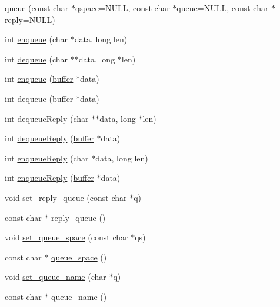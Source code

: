 \begin{DoxyCompactItemize}
\item 
\hyperlink{classatmi_1_1queue_af8c86b01e410fe6499a7f53cdf70eb35}{queue} (const char $\ast$qspace=N\+U\+L\+L, const char $\ast$\hyperlink{classatmi_1_1queue}{queue}=N\+U\+L\+L, const char $\ast$reply=N\+U\+L\+L)
\item 
int \hyperlink{classatmi_1_1queue_a6b27337fd68ca97236e4905d09b7eb15}{enqueue} (char $\ast$data, long len)
\item 
int \hyperlink{classatmi_1_1queue_a140e0faa2ab1265d3258ebc5f2049c41}{dequeue} (char $\ast$$\ast$data, long $\ast$len)
\item 
int \hyperlink{classatmi_1_1queue_a47254fc660abe655dfabb330f30e3148}{enqueue} (\hyperlink{classatmi_1_1buffer}{buffer} $\ast$data)
\item 
int \hyperlink{classatmi_1_1queue_a05cd6e1603e44186f9c11a759c0c6683}{dequeue} (\hyperlink{classatmi_1_1buffer}{buffer} $\ast$data)
\item 
int \hyperlink{classatmi_1_1queue_aa8a60e7609a1c28ec346a898a80f8ea6}{dequeue\+Reply} (char $\ast$$\ast$data, long $\ast$len)
\item 
int \hyperlink{classatmi_1_1queue_a27eee7bbb943c9fae27ced1e20c5690a}{dequeue\+Reply} (\hyperlink{classatmi_1_1buffer}{buffer} $\ast$data)
\item 
int \hyperlink{classatmi_1_1queue_a2ea608bb1f59fdccb2b7592381bcf267}{enqueue\+Reply} (char $\ast$data, long len)
\item 
int \hyperlink{classatmi_1_1queue_abffed5f4f91dedd7e62a445444f8f94e}{enqueue\+Reply} (\hyperlink{classatmi_1_1buffer}{buffer} $\ast$data)
\item 
void \hyperlink{classatmi_1_1queue_a216acfef7e80352c8ce8476825f1146e}{set\+\_\+reply\+\_\+queue} (const char $\ast$q)
\item 
const char $\ast$ \hyperlink{classatmi_1_1queue_ac851146259feb3bf93aed287d6d42cb2}{reply\+\_\+queue} ()
\item 
void \hyperlink{classatmi_1_1queue_a9b8f29fbb2012dda53d6f799ad2110b4}{set\+\_\+queue\+\_\+space} (const char $\ast$qs)
\item 
const char $\ast$ \hyperlink{classatmi_1_1queue_aaf7d8d18008f9ee987b7e7aa2195d1db}{queue\+\_\+space} ()
\item 
void \hyperlink{classatmi_1_1queue_a5d70bbf99076bd41269e2a558bf52475}{set\+\_\+queue\+\_\+name} (char $\ast$q)
\item 
const char $\ast$ \hyperlink{classatmi_1_1queue_adaddc33c75ec6e13f6c57da8d979ad32}{queue\+\_\+name} ()

\end{DoxyCompactItemize}
